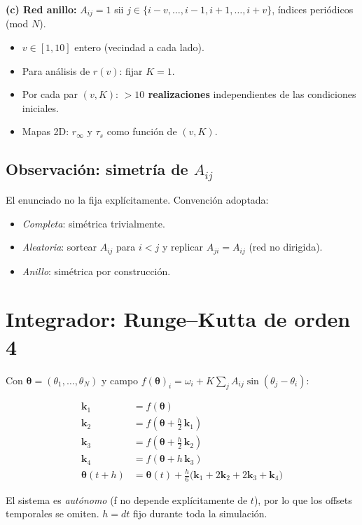 \documentclass[11pt,a4paper]{article}
\begin{document}
\medskip
\textbf{(c) Red anillo:}
$A_{ij}=1$ sii $j \in \{i-v,\ldots,i-1,i+1,\ldots,i+v\}$, índices periódicos (mod $N$).
\begin{itemize}
  \item $v \in [1, 10]$ entero (vecindad a cada lado).
  \item Para análisis de $r(v)$: fijar $K=1$.
  \item Por cada par $(v, K)$: \textbf{$>10$ realizaciones} independientes de las condiciones iniciales.
  \item Mapas 2D: $r_\infty$ y $\tau_s$ como función de $(v, K)$.
\end{itemize}

\subsection*{Observación: simetría de $A_{ij}$}

El enunciado no la fija explícitamente. Convención adoptada:
\begin{itemize}
  \item \emph{Completa}: simétrica trivialmente.
  \item \emph{Aleatoria}: sortear $A_{ij}$ para $i<j$ y replicar $A_{ji}=A_{ij}$ (red no dirigida).
  \item \emph{Anillo}: simétrica por construcción.
\end{itemize}

\section{Integrador: Runge--Kutta de orden 4}

Con $\boldsymbol\theta = (\theta_1,\ldots,\theta_N)$ y campo $f(\boldsymbol\theta)_i = \omega_i + K \sum_j A_{ij}\sin(\theta_j-\theta_i)$:

\begin{align*}
\mathbf k_1 &= f(\boldsymbol\theta) \\
\mathbf k_2 &= f(\boldsymbol\theta + \tfrac{h}{2}\,\mathbf k_1) \\
\mathbf k_3 &= f(\boldsymbol\theta + \tfrac{h}{2}\,\mathbf k_2) \\
\mathbf k_4 &= f(\boldsymbol\theta + h\,\mathbf k_3) \\
\boldsymbol\theta(t+h) &= \boldsymbol\theta(t) + \tfrac{h}{6}\bigl(\mathbf k_1 + 2\mathbf k_2 + 2\mathbf k_3 + \mathbf k_4\bigr)
\end{align*}

El sistema es \emph{autónomo} (f no depende explícitamente de $t$), por lo que los offsets temporales se omiten. $h = dt$ fijo durante toda la simulación.
\end{document}

